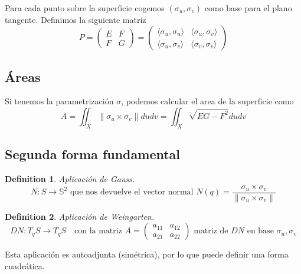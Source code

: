 \documentclass{myclass}
\newtheorem*{definition}{Definition}
\begin{document}
Para cada punto sobre la superficie cogemos  $(\sigma_u, \sigma_v)$ como base para el plano tangente. Definimos la siguiente matriz
\[
P =   \begin{pmatrix} E & F \\ F & G \end{pmatrix} = \begin{pmatrix} \langle \sigma_u , \sigma_u \rangle & \langle \sigma_u , \sigma_v \rangle \\ \langle \sigma_u , \sigma_v \rangle & \langle \sigma_v , \sigma_v \rangle   \end{pmatrix} 
\] 





\subsection{Áreas}
Si tenemos la parametrización $\sigma $, podemos calcular el area de la superficie como
\[
A = \iint_X\|\sigma _u\times \sigma _v\|dudv=  \iint_X \sqrt{EG-F^2}dudv
\] 

\subsection{Segunda forma fundamental}
\begin{definition}
Aplicación de Gauss.
\[
N: S\to \mathbb{S}^2 \text{ que nos devuelve el vector normal } N(q) = \frac{\sigma _u\times \sigma _v}{\|\sigma _u\times \sigma _v\|}
\] 		
\end{definition}

\begin{definition}
Aplicación de Weingarten.
\[
  DN: T_qS \to T_qS \quad \text{con la matriz } A = \begin{pmatrix} a_{11} & a_{12} \\ a_{21} & a_{22} \end{pmatrix} \text{ matriz de } DN \text{ en base }\sigma _u, \sigma _v 
\] 
\end{definition}

Esta aplicación es autoadjunta (simétrica), por lo que puede definir una forma cuadrática.
\end{document}
